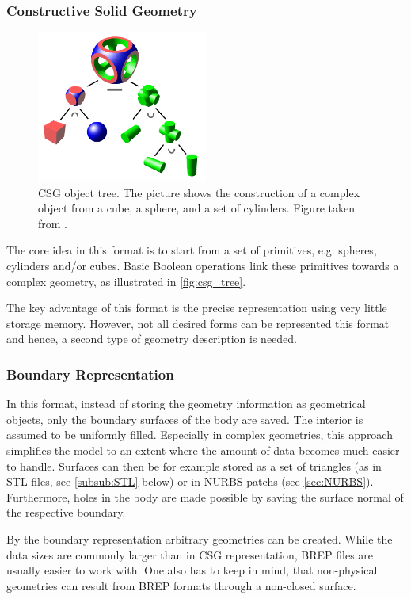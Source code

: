 \subsubsection{Constructive Solid Geometry}
\begin{figure}
\centering
\includegraphics[width=0.5\textwidth]{Pictures/Csg_tree.png}
\caption{\ac{CSG} object tree. The picture shows the construction of a complex object from a cube, a sphere, and a set of cylinders. Figure taken from \cite{WikipediaCSG}.}
\label{fig:csg_tree}
\end{figure}
The core idea in this format is to start from a set of primitives, e.g. spheres, cylinders and/or cubes. Basic Boolean operations link these primitives towards a complex geometry, as illustrated in \autoref{fig:csg_tree}.

The key advantage of this format is the precise representation using very little storage memory. However, not all desired forms can be represented this format and hence, a second type of geometry description is needed. 
\subsubsection{Boundary Representation}
In this format, instead of storing the geometry information as geometrical objects, only the boundary surfaces of the body are saved. The interior is assumed to be uniformly filled. Especially in complex geometries, this approach simplifies the model to an extent where the amount of data becomes much easier to handle. Surfaces can then be for example stored as a set of triangles (as in \ac{STL} files, see \autoref{subsub:STL} below) or in \ac{NURBS} \acsp{patch} (see \autoref{sec:NURBS}).
Furthermore, holes in the body are made possible by saving the surface normal of the respective boundary. 

By the boundary representation arbitrary geometries can be created. While the data sizes are commonly larger than in \ac{CSG} representation, \ac{BREP} files are usually easier to work with. One also has to keep in mind, that non-physical geometries can result from \ac{BREP} formats through a non-closed surface.

